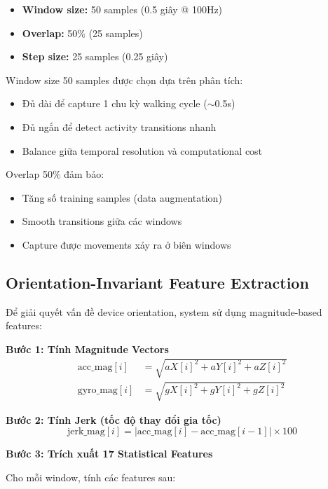 \begin{itemize}
    \item \textbf{Window size:} 50 samples (0.5 giây @ 100Hz)
    \item \textbf{Overlap:} 50\% (25 samples)
    \item \textbf{Step size:} 25 samples (0.25 giây)
\end{itemize}

Window size 50 samples được chọn dựa trên phân tích:
\begin{itemize}
    \item Đủ dài để capture 1 chu kỳ walking cycle ($\sim$0.5s)
    \item Đủ ngắn để detect activity transitions nhanh
    \item Balance giữa temporal resolution và computational cost
\end{itemize}

Overlap 50\% đảm bảo:
\begin{itemize}
    \item Tăng số training samples (data augmentation)
    \item Smooth transitions giữa các windows
    \item Capture được movements xảy ra ở biên windows
\end{itemize}

\subsection{Orientation-Invariant Feature Extraction}
Để giải quyết vấn đề device orientation, system sử dụng magnitude-based features:

\textbf{Bước 1: Tính Magnitude Vectors}
\begin{align}
\text{acc\_mag}[i] &= \sqrt{aX[i]^2 + aY[i]^2 + aZ[i]^2} \\
\text{gyro\_mag}[i] &= \sqrt{gX[i]^2 + gY[i]^2 + gZ[i]^2}
\end{align}

\textbf{Bước 2: Tính Jerk (tốc độ thay đổi gia tốc)}
\begin{equation}
\text{jerk\_mag}[i] = |\text{acc\_mag}[i] - \text{acc\_mag}[i-1]| \times 100
\end{equation}

\textbf{Bước 3: Trích xuất 17 Statistical Features}

Cho mỗi window, tính các features sau:

